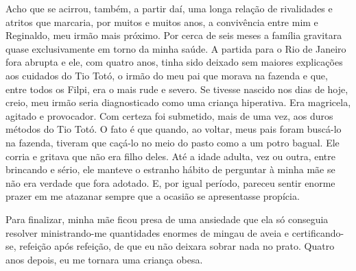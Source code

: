 Acho que se acirrou, também, a partir daí, uma longa relação de rivalidades e atritos que marcaria, por muitos e muitos anos, a convivência entre mim e Reginaldo, meu irmão mais próximo. 
Por cerca de seis meses a família gravitara quase exclusivamente em torno da minha saúde. 
A partida para o Rio de Janeiro fora abrupta e ele, com quatro anos, tinha sido deixado sem maiores explicações aos cuidados do Tio Totó, o irmão do meu pai que morava na fazenda e que, entre todos os Filpi, era o mais rude e severo. Se tivesse nascido nos dias de hoje, creio, meu irmão seria diagnosticado como uma criança hiperativa. 
Era magricela, agitado e provocador. 
Com certeza foi submetido, mais de uma vez, aos duros métodos do Tio Totó. 
O fato é que quando, ao voltar, meus pais foram buscá-lo na fazenda, tiveram que caçá-lo no meio do pasto como a um potro bagual. 
Ele corria e gritava que não era filho deles. 
Até a idade adulta, vez ou outra, entre brincando e sério, ele manteve o estranho hábito de perguntar à minha mãe se não era verdade que fora adotado. 
E, por igual período, pareceu sentir enorme prazer em me atazanar sempre que a ocasião se apresentasse propícia. 

Para finalizar, minha mãe ficou presa de uma ansiedade que ela só conseguia resolver ministrando-me quantidades enormes de mingau de aveia e certificando-se, refeição após refeição, de que eu não deixara sobrar nada no prato. Quatro anos depois, eu me tornara uma criança obesa.
